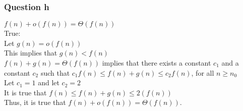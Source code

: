 \documentclass[11pt]{article}
\begin{document}
\subsubsection*{Question h}

$f(n) + o(f(n)) = \Theta(f(n))$\\

True: \\

\indent \indent Let $g(n) = o(f(n)) $\\[6pt]
\indent \indent This implies that $g(n) \less f(n)$\\[6pt]
\indent \indent $f(n) + g(n) = \Theta(f(n))$ implies that there exists a constant $c_1$ and a constant $c_2$ such that $c_1 f(n) \leq f(n) + g(n) \leq c_2 f(n)$, for all $n \geq n_0$\\[6pt]
\indent \indent Let $c_1 = 1 $ and let $c_2 = 2$ \\[6pt]
\indent \indent It is true that $f(n) \leq f(n)+g(n) \leq  2(f(n))$\\[6pt]
\indent \indent Thus, it is true that $f(n) + o(f(n)) = \Theta(f(n))$.\\[6pt]
\end{document}
